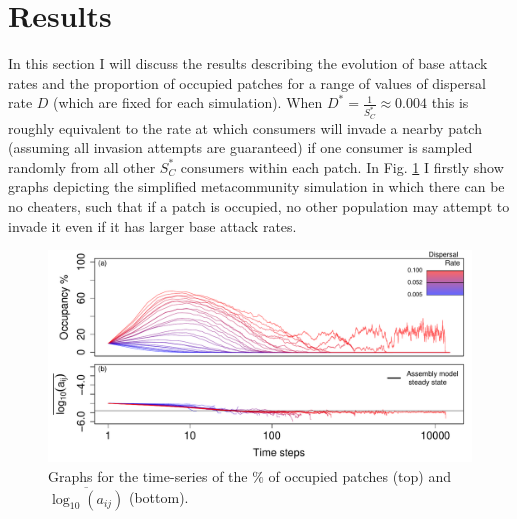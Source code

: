 \documentclass[a4paper]{report}
\DeclareMathOperator{\log}{log}
\begin{document}
\section{Results}

In this section I will discuss the results describing the evolution of base attack rates and the proportion of occupied patches for a range of values of dispersal rate $D$ (which are fixed for each simulation). When $D^*=\frac{1}{S^*_C}\approx 0.004$ this is roughly equivalent to the rate at which consumers will invade a nearby patch (assuming all invasion attempts are guaranteed) if one consumer is sampled randomly from all other $S^*_C$ consumers within each patch. In Fig. \ref{fig:Meta_com_time_series_no_intra} I firstly show graphs depicting the simplified metacommunity simulation in which there can be no cheaters, such that if a patch is occupied, no other population may attempt to invade it even if it has larger base attack rates.

\begin{figure}[H]
\centering{}
\includegraphics[scale=0.7]{../Images/Meta_com_time_series_no_intra.pdf}
\caption{Graphs for the time-series of the $\%$ of occupied patches (top) and $\overline{\log_{10}(a_{ij})}$ (bottom). \label{fig:Meta_com_time_series_no_intra}}
\end{figure}
\end{document}
